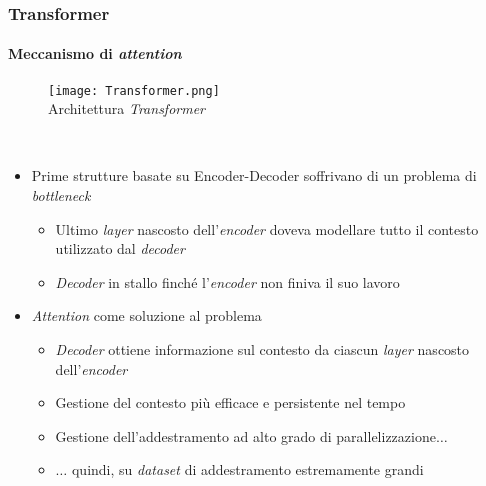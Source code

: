 %
\begin{frame}[t] \frametitle{Transformer}
\framesubtitle{Meccanismo di \emph{attention}}
{\scriptsize
{}
	\begin{minipage}[t]{\textwidth}
		\vspace*{-.5cm}
		\begin{figure}
			\centering
			\texttt{[image: Transformer.png]}
			\\Architettura \emph{Transformer}
		\end{figure}
	\end{minipage}
	\\\vspace*{.3cm}
	\begin{minipage}[t]{\textwidth}
		\begin{itemize}[leftmargin=10pt,align=right]
			\item[\alert{\faArrowCircleRight}] Prime strutture basate su Encoder-Decoder soffrivano di un problema di \emph{bottleneck}
			\begin{itemize}[leftmargin=10pt,align=right]
				\onslide<2->\item[\alert{\faArrowCircleRight}] Ultimo \emph{layer} nascosto dell'\emph{encoder} doveva modellare \alert{tutto} il contesto utilizzato dal \emph{decoder}
				\onslide<3->\item[\alert{\faArrowCircleRight}] \emph{Decoder} in stallo finché l'\emph{encoder} non finiva il suo lavoro
			\end{itemize}
			\item[\alert{\faArrowCircleRight}] \alert{\emph{Attention}} come soluzione al problema
				\begin{itemize}[leftmargin=10pt,align=right]
					\onslide<5->\item[\alert{\faArrowCircleRight}] \emph{Decoder} ottiene informazione sul contesto da ciascun \emph{layer} nascosto dell'\emph{encoder}
					\onslide<6->\item[\alert{\faArrowCircleRight}] Gestione del contesto più efficace e persistente nel tempo
					\onslide<7->\item[\alert{\faArrowCircleRight}] Gestione dell'addestramento ad alto grado di parallelizzazione$\ldots$
					\onslide<8->\item[\alert{\faArrowCircleRight}] $\ldots$ quindi, su \emph{dataset} di addestramento \alert{estremamente grandi}
				\end{itemize}
		\end{itemize}
	\end{minipage}
}
\end{frame}
%